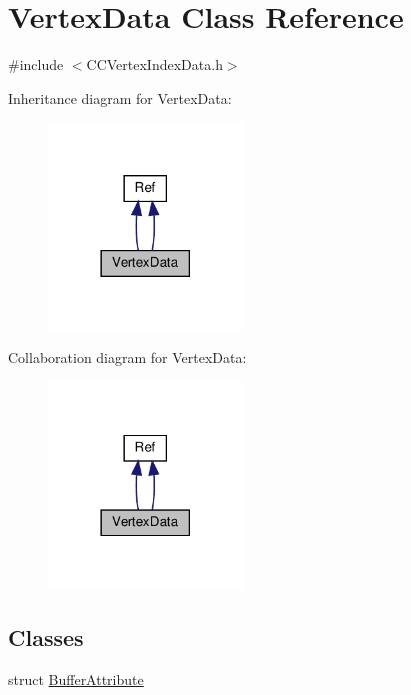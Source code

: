 \hypertarget{classVertexData}{}\section{Vertex\+Data Class Reference}
\label{classVertexData}


{\ttfamily \#include $<$C\+C\+Vertex\+Index\+Data.\+h$>$}



Inheritance diagram for Vertex\+Data\+:
\nopagebreak
\begin{figure}[H]
\begin{center}
\leavevmode
\includegraphics[width=146pt]{classVertexData__inherit__graph}
\end{center}
\end{figure}


Collaboration diagram for Vertex\+Data\+:
\nopagebreak
\begin{figure}[H]
\begin{center}
\leavevmode
\includegraphics[width=146pt]{classVertexData__coll__graph}
\end{center}
\end{figure}
\subsection*{Classes}
\begin{DoxyCompactItemize}
\item 
struct \hyperlink{structVertexData_1_1BufferAttribute}{Buffer\+Attribute}
\end{DoxyCompactItemize}
